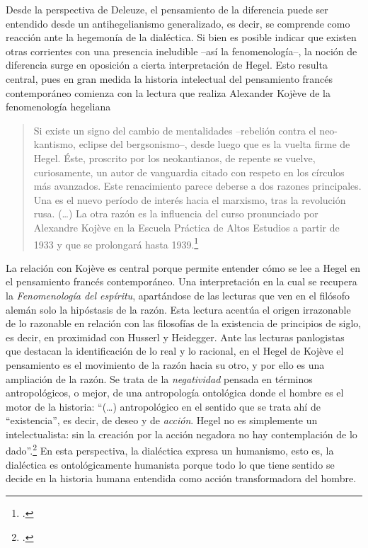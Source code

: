 \documentclass{book}
\begin{document}
Desde la perspectiva de Deleuze, el pensamiento de la diferencia puede
ser entendido desde un antihegelianismo generalizado, es decir, se
comprende como reacción ante la hegemonía de la dialéctica. Si bien es
posible indicar que existen otras corrientes con una presencia
ineludible --así la fenomenología--, la noción de diferencia surge en
oposición a cierta interpretación de Hegel. Esto resulta central, pues
en gran medida la historia intelectual del pensamiento francés
contemporáneo comienza con la lectura que realiza Alexander Kojève de la
fenomenología hegeliana

\begin{quote}
Si existe un signo del cambio de mentalidades --rebelión contra el
neo-kantismo, eclipse del bergsonismo--, desde luego que es la vuelta
firme de Hegel. Éste, proscrito por los neokantianos, de repente se
vuelve, curiosamente, un autor de vanguardia citado con respeto en los
círculos más avanzados. Este renacimiento parece deberse a dos razones
principales. Una es el nuevo período de interés hacia el marxismo, tras
la revolución rusa. (\dots) La otra razón es la influencia del
curso pronunciado por Alexandre Kojève en la Escuela Práctica de Altos
Estudios a partir de 1933 y que se prolongará hasta 1939.\footcite[28]{descombes1998}
\end{quote}

La relación con Kojève es central porque permite entender cómo se lee a
Hegel en el pensamiento francés contemporáneo. Una interpretación en la
cual se recupera la \emph{Fenomenología del espíritu}, apartándose de
las lecturas que ven en el filósofo alemán solo la hipóstasis de la
razón. Esta lectura acentúa el origen irrazonable de lo razonable en
relación con las filosofías de la existencia de principios de siglo, es
decir, en proximidad con Husserl y Heidegger. Ante las lecturas
panlogistas que destacan la identificación de lo real y lo racional, en
el Hegel de Kojève el pensamiento es el movimiento de la razón hacia su
otro, y por ello es una ampliación de la razón. Se trata de la
\emph{negatividad} pensada en términos antropológicos, o mejor, de una
antropología ontológica donde el hombre es el motor de la historia:
\enquote{(\dots) antropológico en el sentido que se trata ahí de
``existencia'', es decir, de deseo y de \emph{acción}. Hegel no es
simplemente un intelectualista: sin la creación por la acción negadora
no hay contemplación de lo dado}.\footcite[53]{kojeve1996} En esta perspectiva, la dialéctica expresa un
humanismo, esto es, la dialéctica es ontológicamente humanista porque
todo lo que tiene sentido se decide en la historia humana entendida como
acción transformadora del hombre.
\end{document}
